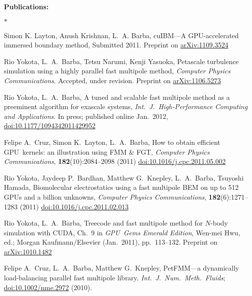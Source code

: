 \documentclass{proposalnsf}
\newcommand{\gpu}{\textsc{GPU}}
\newlength{\up}
\begin{document}
\textbf{Publications:} %
%
\vspace{\up}
\begin{list}{$\ast$}{\setlength{\leftmargin}{1em}}

\item  Simon K. Layton, Anush Krishnan,  L.~A. Barba, cuIBM---A GPU-accelerated immersed boundary method, Submitted 2011. Preprint on \href{http://arxiv.org/abs/1109.3524}{arXiv:1109.3524}

\item  Rio Yokota, L.~A.~Barba, Tetsu Narumi, Kenji Yasuoka, Petascale turbulence simulation using a highly parallel fast multipole method, \textit{Computer Physics Communications}.  Accepted, under revision. Preprint on \href{http://arxiv.org/abs/1106.5273}{arXiv:1106.5273}

\item  Rio Yokota, L.~A.~Barba, A tuned and scalable fast multipole method as a preeminent algorithm for exascale systems, \textit{Int.\ J.\ High-Performance Computing and Applications}. In press; published online Jan.\ 2012, \href{http://hpc.sagepub.com/content/early/2012/01/18/1094342011429952.abstract}{doi:10.1177/1094342011429952}

\item Felipe A.~Cruz, Simon K.~Layton, L.~A.~Barba, How to obtain efficient \gpu\ kernels: an illustration using FMM \& FGT, \textit{Computer Physics Communications}, \textbf{182}(10):2084--2098 (2011) \href{http://dx.doi.org/10.1016/j.cpc.2011.05.002}{doi:10.1016/j.cpc.2011.05.002}

\item Rio Yokota, Jaydeep P.~Bardhan, Matthew G.~Knepley, L.~A.~Barba, Tsuyoshi Hamada, Biomolecular electrostatics using a fast multipole BEM on up to 512 \gpu s and a billion unknowns, \textit{Computer Physics Communications}, \textbf{182}(6):1271--1283 (2011) \href{http://dx.doi.org/10.1016/j.cpc.2011.02.013}{doi:10.1016/j.cpc.2011.02.013}

\item Rio Yokota, L.~A.~Barba, Treecode and fast multipole method for $N$-body simulation with CUDA, Ch.~9 in \textit{\gpu\ Gems Emerald Edition}, Wen-mei Hwu, ed.; Morgan Kaufmann/Elsevier (Jan.~2011), pp.~113--132. Preprint on \href{http://arxiv.org/abs/1010.1482}{arXiv:1010.1482}

\item  Felipe A.~Cruz, L.~A.~Barba, Matthew G.~Knepley, Pet\textsc{FMM}---a dynamically load-balancing parallel fast multipole library.   \textit{Int.\ J.\ Num.\ Meth.\ Fluids}; \href{http://dx.doi.org/10.1002/nme.2972}{doi:10.1002/nme.2972} (2010).


\end{list}
\end{document}

